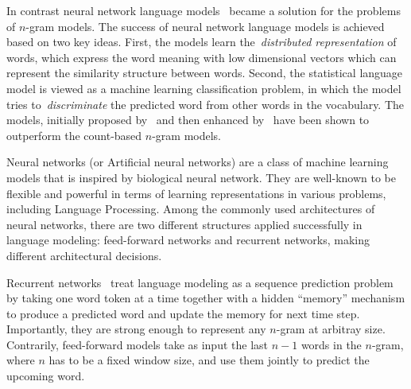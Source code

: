  In contrast neural network language models~\cite{bengio2006neural} became a solution for the problems of $n$-gram models. The success of neural network language models 
 is achieved based on two key ideas. First, the models learn the~\textit{distributed representation} of words, which express the word meaning with low dimensional vectors which can represent the similarity structure between words. Second, the statistical language model is viewed as a machine learning classification problem, in which the model tries to~\textit{discriminate} the predicted word from other words in the vocabulary. The models, initially proposed by~ and then enhanced by~ have been shown to outperform the count-based $n$-gram models. 
 
Neural networks (or Artificial neural networks) are a class of machine learning models that is inspired by biological neural network. They are well-known to be flexible and powerful in terms of learning representations in various problems, including Language Processing. Among the commonly used architectures of neural networks, there are two different structures applied successfully in language modeling: feed-forward networks and recurrent networks, making different architectural decisions. 

Recurrent networks~\cite{mikolov2010recurrent,mikolov2011extensions} treat language modeling as a sequence prediction problem by taking one word token at a time together with a hidden ``memory'' mechanism to produce a predicted word and update the memory for next time step. Importantly, they are strong enough to represent any $n$-gram at arbitray size. Contrarily, feed-forward models take as input the last $n-1$ words in the $n$-gram, where $n$ has to be a fixed window size, and use them jointly to predict the upcoming word. 

%


